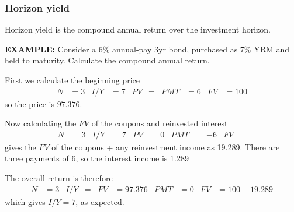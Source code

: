 \documentclass[../notes_compiled.tex]{subfiles}
\begin{document}
\subsubsection{Horizon yield}
\begin{itemize}
\item Horizon yield is the compound annual return over the investment horizon.

{\color{RedViolet}
\item[] \textbf{EXAMPLE:} Consider a 6\% annual-pay 3yr bond, purchased as 7\% YRM and held to maturity. Calculate the compound annual return.

}
{\color{RoyalBlue}
\item[] First we calculate the beginning price
\begin{align*}
N&=3  & I / Y &= 7 & PV &= & PMT &=6 & FV &=100
\end{align*}
so the price is $97.376$.

\item[] Now calculating the $FV$ of the coupons and reinvested interest
\begin{align*}
N&=3  & I / Y &= 7 & PV &=0 & PMT &=-6 & FV &=
\end{align*}
gives the $FV$ of the coupons + any reinvestment income as 19.289. There are three payments of 6, so the interest income is 1.289

\item[] The overall return is therefore
\begin{align*}
N&=3  & I / Y &=  & PV &=97.376 & PMT &=0 & FV &=100 + 19.289
\end{align*}
which gives $I / Y = 7$, as expected.
}
\end{itemize}
\end{document}
